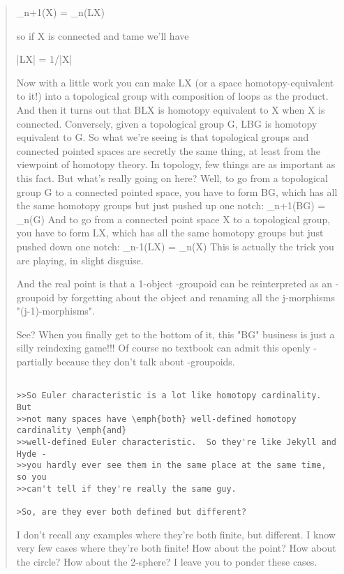 \begin{quote}
\pi _{n+1}(X) = \pi _{n}(LX)

so if X is connected and tame we'll have

|LX| = 1/|X|

Now with a little work you can make LX (or a space homotopy-equivalent
to it!) into a topological group with composition of loops as the product.
And then it turns out that BLX is homotopy equivalent to X when X is
connected.  Conversely, given a topological group G, LBG is homotopy 
equivalent to G.  
So what we're seeing is that topological groups and connected pointed 
spaces are secretly the same thing, at least from the viewpoint of 
homotopy theory.  In topology, few things are as important as this fact.
But what's really going on here?   Well, to go from a topological group G 
to a connected pointed space, you have to form BG, which has all the same 
homotopy groups but just pushed up one notch:
\pi _{n+1}(BG) = \pi _{n}(G)               
And to go from a connected point space X to a topological group, you have 
to form LX, which has all the same homotopy groups but just pushed down one
notch:
\pi _{n-1}(LX) = \pi _{n}(X)              
This is actually the trick you are playing, in slight disguise.

And the real point is that a 1-object \omega -groupoid can be 
reinterpreted as an \omega -groupoid by forgetting about the 
object and renaming all the j-morphisms "(j-1)-morphisms".  

See?  When you finally get to the bottom of it, this "BG" business
is just a silly reindexing game!!!   Of course no textbook can admit 
this openly - partially because they don't talk about \omega -groupoids.


\begin{verbatim}

>>So Euler characteristic is a lot like homotopy cardinality.  But
>>not many spaces have \emph{both} well-defined homotopy cardinality \emph{and} 
>>well-defined Euler characteristic.  So they're like Jekyll and Hyde - 
>>you hardly ever see them in the same place at the same time, so you 
>>can't tell if they're really the same guy.

>So, are they ever both defined but different?
\end{verbatim}
    

I don't recall any examples where they're both finite, but different.  
I know very few cases where they're both finite!   How about the point?
How about the circle?  How about the 2-sphere?  I leave you to ponder 
these cases.



\end{quote}
